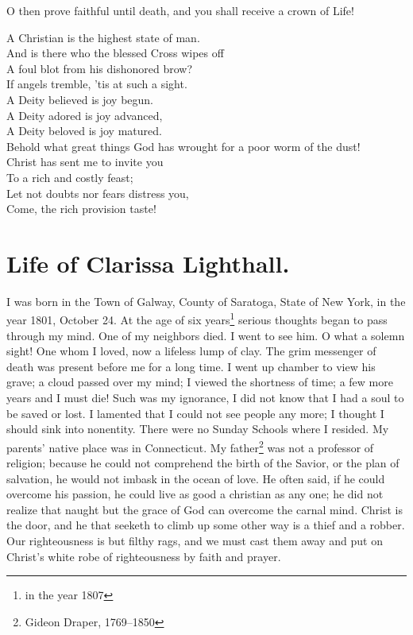 O then prove faithful until death, and you shall receive a crown of Life!
\begin{center}
A Christian is the highest state of man.\\
And is there who the blessed Cross wipes off\\
A foul blot from his dishonored brow?\\
If angels tremble, 'tis at such a sight.\\
A Deity believed is joy begun.\\
A Deity adored is joy advanced,\\
A Deity beloved is joy matured.\\
Behold what great things God has wrought for a poor worm of the dust!\\
Christ has sent me to invite you\\
To a rich and costly feast;\\
Let not doubts nor fears distress you,\\
Come, the rich provision taste!
\end{center}

\section*{Life of Clarissa Lighthall.}
I was born in the Town of Galway, County of Saratoga, State of New York, in the year 1801, October 24.
At the age of six years\footnote{in the year 1807} serious thoughts began to pass through my mind.
One of my neighbors died.
I went to see him.
O what a solemn sight!
One whom I loved, now a lifeless lump of clay.
The grim messenger of death was present before me for a long time.
I went up chamber to view his grave; a cloud passed over my mind; I viewed the shortness of time; a few more years and I must die!
Such was my ignorance, I did not know that I had a soul to be saved or lost.
I lamented that I could not see people any more; I thought I should sink into nonentity.
There were no Sunday Schools where I resided.
My parents' native place was in Connecticut.
My father\footnote{Gideon Draper, 1769--1850} was not a professor of religion; because he could not comprehend the birth of the Savior, or the plan of salvation, he would not imbask in the ocean of love.
He often said, if he could overcome his passion, he could live as good a christian as any one; he did not realize that naught but the grace of God can overcome the carnal mind.
Christ is the door, and he that seeketh to climb up some other way is a thief and a robber.
Our righteousness is but filthy rags, and we must cast them away and put on Christ's white robe of righteousness by faith and prayer.

